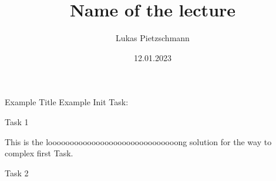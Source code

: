 \documentclass[english, uulm, solution]{exercise}
\title{Name of the lecture}
\author{Lukas Pietzschmann}
\institute{The best institute ever}
\date{12.01.2023}
\begin{document}
	\maketitle

	\begin{exercise}{Example Title}
		Example Init Task:
		\begin{tasks}
			\item Task 1
				\begin{solution}
					This is the loooooooooooooooooooooooooooooong solution for the way to complex first Task.
				\end{solution}
			\item Task 2
		\end{tasks}
	\end{exercise}
\end{document}
